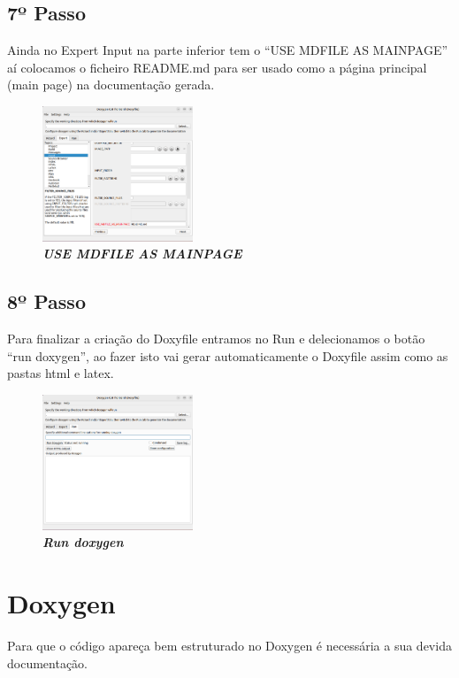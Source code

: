 \documentclass[a4wide]{report}
\begin{document}
{{{{\subsection{7º Passo}
\Large
Ainda no Expert Input na parte inferior tem o “USE MDFILE AS MAINPAGE” aí colocamos o ficheiro README.md  para ser usado como a página principal (main page) na documentação gerada.  
\begin{figure}[hbt]
    \centering
    \includegraphics[width=0.40\textwidth]{imagem_7.png}
    \caption{\textbf{\textit{USE MDFILE AS MAINPAGE}}\label{fig:imagem}}
\end{figure}

\subsection{8º Passo}
\Large
Para finalizar a criação do Doxyfile entramos no Run e delecionamos o botão “run doxygen”, ao fazer isto vai gerar automaticamente o Doxyfile assim como as pastas html e latex. 
\begin{figure}[hbt]
    \centering
    \includegraphics[width=0.40\textwidth]{imagem_8.png}
    \caption{\textbf{\textit{Run doxygen}}\label{fig:imagem}}
\end{figure}



\newpage
\section{Doxygen}
\Large
Para que o código apareça bem estruturado no Doxygen é necessária a sua devida documentação. 

}}}}
\end{document}
